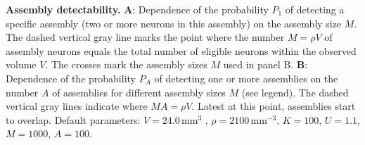 
{\bf Assembly detectability.} 
{\bf A}: Dependence of the probability $P_1$ of detecting a specific assembly (two or more neurons
in this assembly) on the assembly size $M$.
The dashed vertical gray line marks the point where the number $M = \rho{}V$ of assembly neurons equals the total number of eligible neurons within the observed volume $V$.
The crosses mark the assembly sizes $M$ used in panel B.
{\bf B}: Dependence of the probability $P_A$ of detecting one or more assemblies on the number $A$ of assemblies for different assembly sizes $M$ (see legend).
The dashed vertical gray lines indicate where $MA = \rho{}V$. Latest at this point, assemblies start to overlap.
Default parameters: $V=24.0\,\text{mm}^3$ , $\rho=2100\,\text{mm}^{-3}$, $K=100$, $U=1.1$, $M=1000$, $A=100$.
    